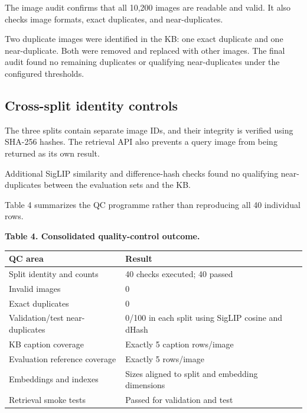 \documentclass{article}
\begin{document}
The image audit confirms that all 10,200 images are readable and
valid. It also checks image formats, exact duplicates, and
near-duplicates.

Two duplicate images were identified in the KB: one exact duplicate
and one near-duplicate. Both were removed and replaced with other
images. The final audit found no remaining duplicates or qualifying
near-duplicates under the configured thresholds.

\subsection{Cross-split identity
controls}\label{cross-split-identity-controls}

The three splits contain separate image IDs, and their integrity is
verified using SHA-256 hashes. The retrieval API also prevents a
query image from being returned as its own result.

Additional SigLIP similarity and difference-hash checks found no
qualifying near-duplicates between the evaluation sets and the KB.

Table 4 summarizes the QC programme rather than
reproducing all 40 individual rows.

\begin{center}
\textbf{Table 4. Consolidated quality-control outcome.}
\end{center}
\label{tab:qc}

\begin{table}[htbp]
\centering
\begin{tabular}{lp{9.2cm}}
\toprule
QC area & Result \\
\midrule
Split identity and counts & 40 checks executed; 40 passed \\
Invalid images & 0 \\
Exact duplicates & 0 \\
Validation/test near-duplicates & 0/100 in each split using SigLIP cosine and dHash \\
KB caption coverage & Exactly 5 caption rows/image \\
Evaluation reference coverage & Exactly 5 rows/image \\
Embeddings and indexes & Sizes aligned to split and embedding dimensions \\
Retrieval smoke tests & Passed for validation and test \\
\bottomrule
\end{tabular}
\end{table}
\end{document}
